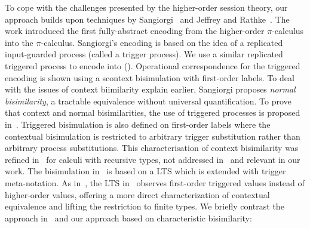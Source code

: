 To cope with the challenges presented by the higher-order
session theory, 
our approach builds upon techniques by Sangiorgi~\cite{SangiorgiD:expmpa,San96H}
and Jeffrey and Rathke~\cite{JeffreyR05}.
The work %
\cite{SangiorgiD:expmpa}
introduced the first fully-abstract encoding from the higher-order 
$\pi$-calculus into the $\pi$-calculus. 
Sangiorgi's encoding is based on the idea of a replicated input-guarded process 
(called a trigger process). We use a similar 
replicated triggered process 
to encode \HOp into \sessp ().
 Operational correspondence for
the triggered encoding is shown using a scontext bisimulation
with first-order labels.
To deal with the issues of context biimilarity explain earlier, 
Sangiorgi proposes \emph{normal bisimilarity}, 
a tractable  equivalence without universal quantification. 
To prove that context and normal bisimilarities, 
the use of triggered processes is proposed in~\cite{SangiorgiD:expmpa}.
Triggered bisimulation is also defined on first-order labels
where the contextual bisimulation is restricted to arbitrary
trigger substitution rather than arbitrary process substitutions.
This
characterisation of context bisimilarity  was refined in~\cite{JeffreyR05} for
calculi with recursive types, not addressed in~\cite{San96H,SangiorgiD:expmpa} and
relevant in our work.
The
bisimulation in~\cite{JeffreyR05}
is based on a LTS which is extended with trigger meta-notation.
As in~\cite{San96H,SangiorgiD:expmpa}, 
the LTS in~\cite{JeffreyR05}
observes first-order triggered values instead of
higher-order values, offering a more direct characterization of contextual equivalence
and lifting the restriction to finite types.
We briefly contrast 
the approach in~\cite{JeffreyR05} and our approach based on 
characteristic bisimilarity:
